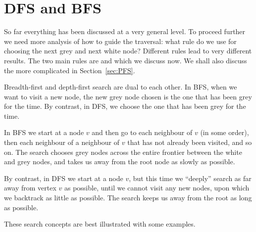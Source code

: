 \section{DFS and BFS}
\label{sec:BFSDFS}

So far everything has been discussed at a very general level. To proceed
further we need more analysis of how to guide the traversal: what rule do
we use for choosing the next grey and next white node? Different rules lead
to very different results. The two main rules are  and  which we discuss now.
We shall also discuss the more complicated  in Section~\ref{sec:PFS}.

Breadth-first and depth-first search are dual to each other.
In BFS, when we want to visit a new node, the new grey node chosen is
the one that has been grey for the  time. By contrast, in DFS, we choose the one that has been grey for the  time.

In BFS we start at a node $v$ and then go to each neighbour of $v$ (in
some order), then each neighbour of a neighbour of $v$ that has not
already been visited, and so on. The search chooses grey nodes across
the entire  frontier between the white and grey nodes, and takes us away
from the root node as slowly as possible.

By contrast, in  DFS we start at a node $v$, but this time we ``deeply''
search as far away from vertex $v$ as possible, until we cannot visit
any new nodes, upon which we backtrack as little as possible. The search
keeps us away from the root as long as possible.

These search concepts are best illustrated with some examples.

